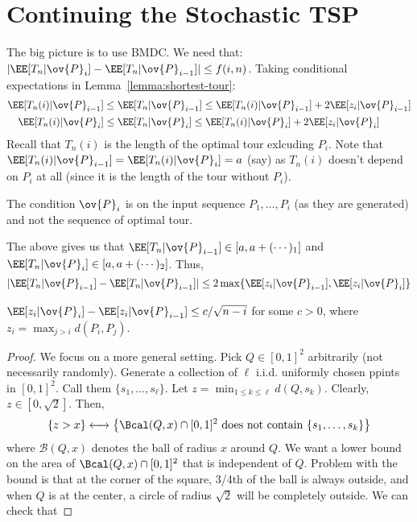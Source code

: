 \chapter{Continuing the Stochastic TSP}
\begin{eg}
The big picture is to use BMDC. We need that: $|\EE[T_n|\ov{P}_i] - \EE[T_n|\ov{P}_{i-1}]| \leq f(i,n)$. Taking conditional expectations in Lemma~\ref{lemma:shortest-tour}:
\begin{align*}
    \EE[T_n(i) | \ov{P}_{i-1}] &\leq \EE[T_n | \ov{P}_{i-1}] \leq \EE[T_n(i) | \ov{P}_{i-1}] + 2\EE[z_i | \ov{P}_{i-1}] \\ 
    \EE[T_n(i) | \ov{P}_{i}] &\leq \EE[T_n | \ov{P}_{i}] \leq \EE[T_n(i) | \ov{P}_{i}] + 2\EE[z_i | \ov{P}_{i}]
\end{align*}
Recall that $T_n(i)$ is the length of the optimal tour exlcuding $P_i$. Note that $\EE[T_n(i) | \ov{P}_{i-1}] = \EE[T_n(i) | \ov{P}_i] = a$ (say) as $T_n(i)$ doesn't depend on $P_i$ at all (since it is the length of the tour without $P_i$).
\begin{note}
The condition $\ov{P}_i$ is on the input sequence $P_1, \dots, P_i$ (as they are generated) and not the sequence of optimal tour.
\end{note}
The above gives us that $\EE[T_n|\ov{P}_{i-1}] \in [a, a + (\cdots)_1]$ and $\EE[T_n|\ov{P}_{i}] \in [a,a + (\cdots)_2]$. Thus,
\[
|\EE[T_n|\ov{P}_{i-1}] - \EE[T_n|\ov{P}_{i-1}]| \leq 2 \max \{\EE[z_i | \ov{P}_{i-1}], \EE[z_i | \ov{P}_{i}]\}  
\]
\newcommand{\ovp}{\ov{P}}
\begin{lemma}
$\EE[z_i | \ovp_i] - \EE[z_i|\ovp_{i-1}] \leq c/\sqrt{n-i}$ for some $c > 0$, where $z_i = \max_{j > i} d(P_i, P_j)$.
\end{lemma}
\begin{proof}
We focus on a more general setting. Pick $Q \in [0,1]^2$ arbitrarily (not necessarily randomly). Generate a collection of $\ell$ i.i.d. uniformly chosen ppints in $[0,1]^2$. Call them $\{s_1, \dots, s_\ell\}$. Let $z = \min_{1\leq k\leq \ell} d(Q, s_k)$. Clearly, $z \in [0,\sqrt2]$. Then,
\[
\{z > x\} \longleftrightarrow \left\{\Bcal(Q, x) \cap [0,1]^2 \text{ does not contain } \{s_1, \dots, s_k\}\right\}
\]
where $\mathcal{B}(Q,x)$ denotes the ball of radius $x$ around $Q$. We want a lower bound on the area of $\Bcal(Q,x) \cap [0,1]^2$ that is independent of $Q$. Problem with the bound is that at the corner of the square, 3/4th of the ball is always outside, and when $Q$ is at the center, a circle of radius $\sqrt{2}$ will be completely outside. We can check that

\end{proof}
\end{eg}
